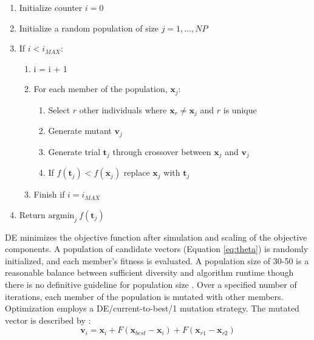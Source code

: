 \begin{enumerate}[noitemsep]
    \item Initialize counter $i=0$
    \item Initialize a random population of size $j = 1, \dots, NP$
    \item If $i < i_{MAX}$:
          \begin{enumerate}
              \item i = i + 1
              \item For each member of the population, $\mathbf{x}_{j}$:
                    \begin{enumerate}[noitemsep]
                        \item Select $r$ other individuals where $\mathbf{x}_{r} \neq \mathbf{x}_{j}$ and $r$ is unique
                        \item Generate mutant $\mathbf{v}_{j}$
                        \item Generate trial $\mathbf{t}_{j}$ through crossover between $\mathbf{x}_{j}$ and $\mathbf{v}_{j}$
                        \item If $f(\mathbf{t}_{j}) < f(\mathbf{x}_{j})$ replace $\mathbf{x}_{j}$ with $\mathbf{t}_{j}$
                    \end{enumerate}
              \item Finish if $i = i_{MAX}$
          \end{enumerate}
    \item Return $\text{argmin}_{j} \ f(\mathbf{t}_{j})$
\end{enumerate}

\Gls{DE} minimizes the objective function after simulation and scaling of the objective components. A population of candidate vectors (Equation \ref{eq:theta}) is randomly initialized, and each member's fitness is evaluated. A population size of 30-50 is a reasonable balance between sufficient diversity and algorithm runtime though there is no definitive guideline for population size \citep{piotrowski2017review}. Over a specified number of iterations, each member of the population is mutated with other members. Optimization employs a DE/current-to-best/1 mutation strategy. The mutated vector is described by \citep{georgioudakis2020comparative}:
\begin{equation}
    \mathbf{v}_{i} = \mathbf{x}_{i} + F(\mathbf{x}_{best}-\mathbf{x}_{i}) + F(\mathbf{x}_{r1} - \mathbf{x}_{r2})
    \label{eq:mutation}
\end{equation}

